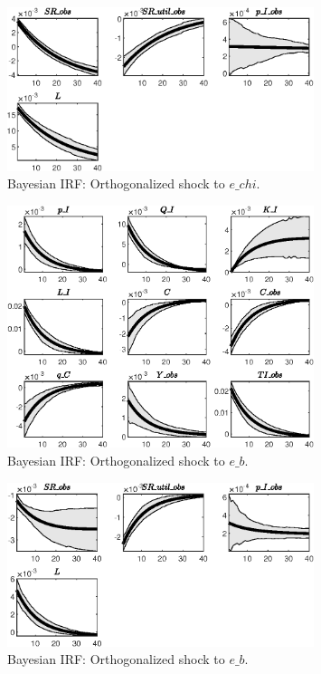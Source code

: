 \begin{figure}[H]
\centering 
\includegraphics[width=0.80\textwidth]{directed_search/Output/directed_search_Bayesian_IRF_e_chi_2}
\caption{Bayesian IRF: Orthogonalized shock to $e\_chi$.}
\label{Fig:BayesianIRF:e_chi:2}
\end{figure}
 
\begin{figure}[H]
\centering 
\includegraphics[width=0.80\textwidth]{directed_search/Output/directed_search_Bayesian_IRF_e_b_1}
\caption{Bayesian IRF: Orthogonalized shock to $e\_b$.}
\label{Fig:BayesianIRF:e_b:1}
\end{figure}
 
\begin{figure}[H]
\centering 
\includegraphics[width=0.80\textwidth]{directed_search/Output/directed_search_Bayesian_IRF_e_b_2}
\caption{Bayesian IRF: Orthogonalized shock to $e\_b$.}
\label{Fig:BayesianIRF:e_b:2}
\end{figure}
 
